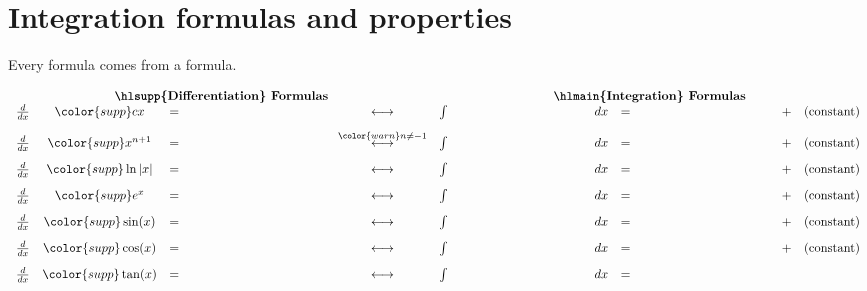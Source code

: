\documentclass[../main.tex]{subfiles}
\begin{document}
 \section{Integration formulas and properties} \label{lession:integration-formulas}
Every  formula comes from a  formula.

\[
  \begin{array}{rcclcrclllcl} 
    \multicolumn{5}{c}{\text{\textbf{\hlsupp{Differentiation} Formulas}}} & \multicolumn{7}{c}{\text{\textbf{\hlmain{Integration} Formulas}}} \\
    \frac{d}{dx} & {\color{supp} cx} &=& \phantom{\color{main} c}
                 & \longleftrightarrow 
                 & \int & \phantom{\color{main} c} & dx &=& \phantom{\color{supp} cx} 
                 &+& (\text{constant}) \\[2ex]
    \frac{d}{dx} & {\color{supp} x^{n+1}  } &=& \phantom{\color{main} (n+1) x^{n}}
                 & \overset{\color{warn} n \ne -1}{\longleftrightarrow}
                 & \int & \phantom{\color{main} x^{n}} & dx &=& \phantom{\color{supp} \frac{x^{n+1}}{n+1} } 
                 &+& (\text{constant}) \\[2ex]
    \frac{d}{dx} & {\color{supp} \ln|x| } &=& \phantom{\color{main} x^{-1}}
                 & \longleftrightarrow 
                 & \int & \phantom{\color{main} x^{-1}} & dx &=& \phantom{\color{supp} \ln|x|} 
                 &+& (\text{constant}) \\[2ex]
    \frac{d}{dx} & {\color{supp} e^{x}} &=& \phantom{\color{main} e^{x}}
                 & \longleftrightarrow
                 & \int & \phantom{\color{main} e^{x}      } & dx &=& \phantom{\color{supp} e^{x}} 
                 &+& (\text{constant}) \\[2ex]
    \frac{d}{dx} & {\color{supp} \sin(x)} &=& \phantom{\color{main} \cos(x)}
                 & \longleftrightarrow 
                 & \int & \phantom{\color{main} \cos(x)} & dx &=& \phantom{\color{supp} \sin(x)} 
                 &+& (\text{constant}) \\[2ex]
    \frac{d}{dx} & {\color{supp} \cos(x)} &=& \phantom{\color{main} -\sin(x)}
                 & \longleftrightarrow 
                 & \int & \phantom{\color{main} \sin(x)} & dx &=& \phantom{\color{supp} -\cos(x)} 
                 &+& (\text{constant}) \\[2ex]
    \frac{d}{dx} & {\color{supp} \tan(x)} &=& \phantom{\color{main} \sec^{2}(x)}
                 & \longleftrightarrow 
                 & \int & \phantom{\color{main} \sec^{2}(x)} & dx &=& \phantom{\color{supp} \tan(x)} 

\end{array}\]
\end{document}
